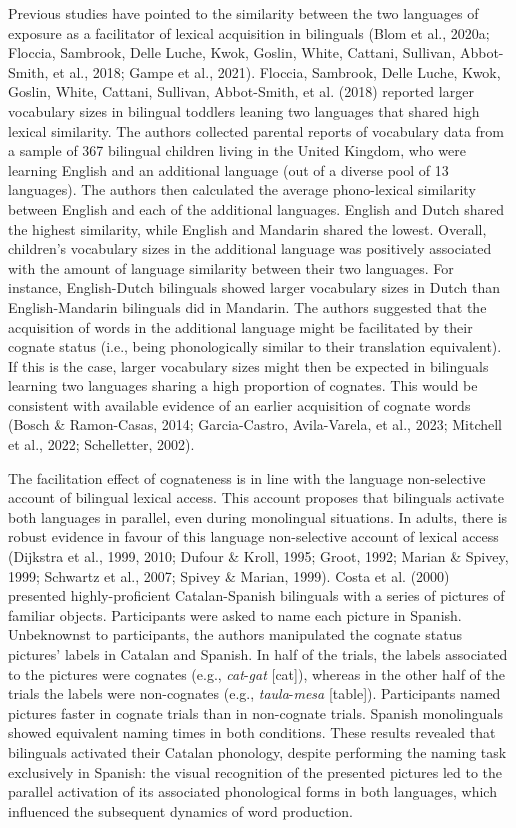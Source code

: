 \documentclass[
  12pt,
  b5paperpaper,
  twoside]{scrreprt}
\begin{document}
Previous studies have pointed to the similarity between the two
languages of exposure as a facilitator of lexical acquisition in
bilinguals (Blom et al., 2020a; Floccia, Sambrook, Delle Luche, Kwok,
Goslin, White, Cattani, Sullivan, Abbot-Smith, et al., 2018; Gampe et
al., 2021). Floccia, Sambrook, Delle Luche, Kwok, Goslin, White,
Cattani, Sullivan, Abbot-Smith, et al. (2018) reported larger vocabulary
sizes in bilingual toddlers leaning two languages that shared high
lexical similarity. The authors collected parental reports of vocabulary
data from a sample of 367 bilingual children living in the United
Kingdom, who were learning English and an additional language (out of a
diverse pool of 13 languages). The authors then calculated the average
phono-lexical similarity between English and each of the additional
languages. English and Dutch shared the highest similarity, while
English and Mandarin shared the lowest. Overall, children's vocabulary
sizes in the additional language was positively associated with the
amount of language similarity between their two languages. For instance,
English-Dutch bilinguals showed larger vocabulary sizes in Dutch than
English-Mandarin bilinguals did in Mandarin. The authors suggested that
the acquisition of words in the additional language might be facilitated
by their cognate status (i.e., being phonologically similar to their
translation equivalent). If this is the case, larger vocabulary sizes
might then be expected in bilinguals learning two languages sharing a
high proportion of cognates. This would be consistent with available
evidence of an earlier acquisition of cognate words (Bosch \&
Ramon-Casas, 2014; Garcia-Castro, Avila-Varela, et al., 2023; Mitchell
et al., 2022; Schelletter, 2002).

The facilitation effect of cognateness is in line with the language
non-selective account of bilingual lexical access. This account proposes
that bilinguals activate both languages in parallel, even during
monolingual situations. In adults, there is robust evidence in favour of
this language non-selective account of lexical access (Dijkstra et al.,
1999, 2010; Dufour \& Kroll, 1995; Groot, 1992; Marian \& Spivey, 1999;
Schwartz et al., 2007; Spivey \& Marian, 1999). Costa et al. (2000)
presented highly-proficient Catalan-Spanish bilinguals with a series of
pictures of familiar objects. Participants were asked to name each
picture in Spanish. Unbeknownst to participants, the authors manipulated
the cognate status pictures' labels in Catalan and Spanish. In half of
the trials, the labels associated to the pictures were cognates (e.g.,
\emph{cat}-\emph{gat} {[}cat{]}), whereas in the other half of the
trials the labels were non-cognates (e.g., \emph{taula}-\emph{mesa}
{[}table{]}). Participants named pictures faster in cognate trials than
in non-cognate trials. Spanish monolinguals showed equivalent naming
times in both conditions. These results revealed that bilinguals
activated their Catalan phonology, despite performing the naming task
exclusively in Spanish: the visual recognition of the presented pictures
led to the parallel activation of its associated phonological forms in
both languages, which influenced the subsequent dynamics of word
production.
\end{document}
